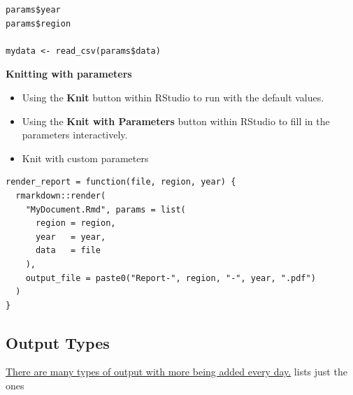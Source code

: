 \documentclass[]{book}
\providecommand{\tightlist}{%
  \setlength{\itemsep}{0pt}\setlength{\parskip}{0pt}}
\begin{document}
\begin{verbatim}
params$year
params$region

mydata <- read_csv(params$data)
\end{verbatim}

\textbf{Knitting with parameters}

\begin{itemize}
\tightlist
\item
  Using the \textbf{Knit} button within RStudio to run with the default
  values.
\item
  Using the \textbf{Knit with Parameters} button within RStudio to fill
  in the parameters interactively.
\item
  Knit with custom parameters
\end{itemize}

\begin{verbatim}
render_report = function(file, region, year) {
  rmarkdown::render(
    "MyDocument.Rmd", params = list(
      region = region,
      year   = year,
      data   = file
    ),
    output_file = paste0("Report-", region, "-", year, ".pdf")
  )
}
\end{verbatim}

\subsection{Output Types}\label{output-types}

\href{https://rmarkdown.rstudio.com/formats.html}{There are many types
of output with more being added every day.} lists just the ones
\end{document}
